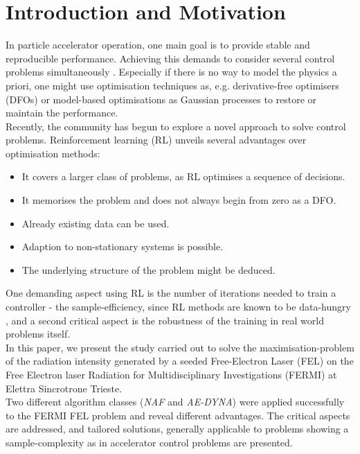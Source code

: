 \documentclass[
reprint,
amsmath,amssymb,amsfonts,clevref,
aps,
prstab,
]{revtex4-2}
\begin{document}
	\section{Introduction and Motivation}
	In particle accelerator operation, one main goal is to provide stable and reproducible performance. Achieving this demands to consider several control problems simultaneously \cite{Kain2020}. Especially if there is no way to model the physics a priori, one might use optimisation techniques as, e.g. derivative-free optimisers (DFOs) \cite{Huang2013,Bruchon2017,Scheinker2020,Hirlaender2019,Welsch2015,Albright2019} or model-based optimisations as Gaussian processes \cite{Hanuka2020,Roussel2020} to restore or maintain the performance.\\
	 Recently, the community has begun to explore a novel approach to solve control problems. Reinforcement learning (RL) \cite{Bruchon2020,Bruchon2019,Kain2020,Pang2020} unveils several advantages over optimisation methods:
	\begin{itemize}
		\item It covers a larger class of problems, as RL optimises a sequence of decisions.
		\item It memorises the problem and does not always begin from zero as a DFO.
		\item Already existing data can be used.
		\item Adaption to non-stationary systems is possible.
		\item The underlying structure of the problem might be deduced.
	\end{itemize}
	One demanding aspect using RL is the number of iterations needed to train a controller - the sample-efficiency, since RL methods are known to be data-hungry \cite{Sutton2018,DulacArnold2019}, and a second critical aspect is the robustness of the training in real world problems itself.\\
	In this paper, we present the study carried out to solve the maximisation-problem of the radiation intensity generated by a seeded Free-Electron Laser (FEL) on the Free Electron laser Radiation for Multidisciplinary Investigations (FERMI) at Elettra Sincrotrone Trieste.\\
	 Two different algorithm classes (\emph{NAF} and \emph{AE-DYNA}) were applied successfully to the FERMI FEL problem and reveal different advantages. The critical aspects are addressed, and tailored solutions, generally applicable to problems showing a sample-complexity as in accelerator control problems are presented.
\end{document}
